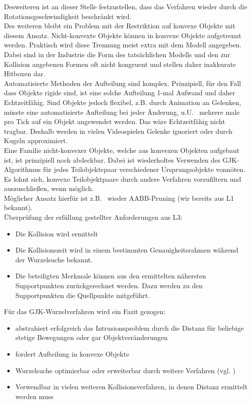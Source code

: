 Desweiteren ist an dieser Stelle festzustellen, dass das Verfahren wieder durch die Rotationsgeschwindigkeit beschränkt wird.
\\
Des weiteren bleibt ein Problem mit der Restriktion auf konvexe Objekte mit diesem Ansatz. 
Nicht-konvexte Objekte können in konvexe Objekte aufgetrennt werden. Praktisch wird diese Trennung meist extra mit dem Modell angegeben. Dabei sind in der Industrie die Form des tatsächlichen Modells und den zur Kollision angebenen Formen oft nicht kongruent und stellen daher inakkurate Hitboxen dar.\\
Automatisierte Methoden der Aufteilung sind komplex. Prinzipiell, für den Fall dass Objekte rigide sind, ist eine solche Aufteilung 1-mal Aufwand und daher Echtzeitfähig. Sind Objekte jedoch flexibel, z.B. durch Animation an Gelenken, müsste eine automatisierte Aufteilung bei jeder Änderung, u.U.~ mehrere male pro Tick auf ein Objekt angewendet werden. Das wäre Echtzeitfähig nicht tragbar. Deshalb werden in vielen Videospielen Gelenke ignoriert oder durch Kugeln approximiert.\\
Eine Familie nicht-konvexer Objekte, welche aus konvexen Objekten aufgebaut ist, ist prinzipiell noch abdeckbar. Dabei ist wiederholtes Verwenden des GJK-Algorithmus für jedes Teilobjektepaar verschiedener Ursprungsobjekte vonnöten. \\
Es lohnt sich, konvexe Teilobjektpaare durch andere Verfahren vorzufiltern und auszuschließen, wenn möglich.\\
Möglicher Ansatz hierfür ist z.B.~ wieder AABB-Pruning (wir bereits aus L1 bekannt).
\\
Überprüfung der erfüllung gestellter Anforderungen aus L3:\\
\begin{itemize}
	\item Die Kollision wird ermittelt
	\item Die Kollisionszeit wird in einem bestimmten Genauigkeitsrahmen während der Wurzelsuche bekannt.
	\item Die beteiligten Merkmale können aus den ermittelten nähersten Supportpunkten zurückgerechnet werden. Dazu werden zu den Supportpunkten die Quellpunkte mitgeführt.
\end{itemize}

Für das GJK-Wurzelverfahren wird ein Fazit gezogen:
\begin{itemize}
	\item abstrahiert erfolgreich das Intrusionsproblem durch die Distanz für beliebige stetige Bewegungen oder gar Objektveränderungen
	\item fordert Aufteilung in konvexe Objekte
	\item Wurzelsuche optimierbar oder erweiterbar durch weitere Verfahren (vgl. \cite{gdc-physics})
	\item Verwendbar in vielen weiteren Kollisionsverfahren, in denen Distanz ermittelt werden muss
\end{itemize}

